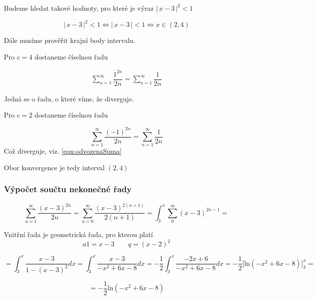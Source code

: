 \noindent Budeme hledat takové hodnoty, pro které je výraz $\big |\,x-3\,\big |^{2} < 1$

\begin{displaymath}
\big |\,x-3\,\big |^{2} < 1\Leftrightarrow \big |\,x-3\,\big | < 1 \Leftrightarrow x \in (2, 4)
\end{displaymath}

\noindent Dále musíme prověřit krajní body intervalu.
\vspace{10px}

\noindent Pro $c = 4$ dostaneme číselnou řadu

\begin{eqnarray}
\sum_{n=1}^{\infty} \dfrac{1^{2n}}{2n} = \sum_{n=1}^{\infty} \dfrac{1}{2n}
\label{eqn:odvozenaSuma}
\end{eqnarray}

\noindent Jedná se o řadu, o které víme, že diverguje.
\vspace{10px}

\noindent Pro $c = 2$ dostaneme číselnou řadu

\begin{displaymath}
\sum_{n=1}^{\infty} \dfrac{(-1)^{2n}}{2n} = \sum_{n=1}^{\infty} \dfrac{1}{2n}
\end{displaymath}
\noindent Což diverguje, viz. \ref{eqn:odvozenaSuma}

\vspace{10px}

\noindent Obor konvergence je tedy interval $(2, 4)$

\subsubsection{Výpočet součtu nekonečné řady}

\begin{displaymath}
\sum_{a = 1}^{\infty} \dfrac{(x - 3)^{2n}}{2n} = \sum_{a = 0}^{\infty} \dfrac{(x - 3)^{2(n + 1)}}{2(n + 1)} = \int_{3}^{x} \sum_0^{\infty} (x - 3)^{2n - 1} =
\end{displaymath}

Vnitřní řada je geometrická řada, pro kterou platí
\begin{displaymath}
a1 = x - 3 \qquad q = (x - 2)^2
\end{displaymath}

\begin{displaymath}
= \int_{3}^{x} \dfrac{x - 3}{1 - (x - 3)^2}dx =  \int_{3}^{x} \dfrac{x - 3}{- x^2+6x-8}dx = - \frac{1}{2}  \int_{3}^{x} \dfrac{-2x + 6}{- x^2+6x-8}dx =- \frac{1}{2} \Big [  \mbox{ln}(-x^2 + 6x - 8) \Big ]_3^x =
\end{displaymath}

\begin{displaymath}
= - \frac{1}{2} \mbox{ln}(-x^2 + 6x - 8)
\end{displaymath}



